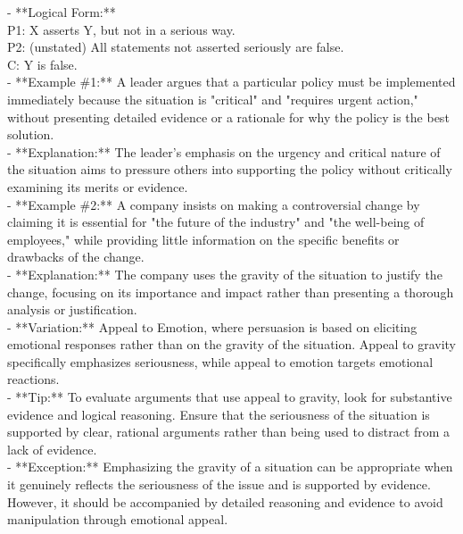 \documentclass[a4paper,12pt,single,pdftex]{scrbook}
\begin{document}
    
      - **Logical Form:**
    \\

    
      P1: X asserts Y, but not in a serious way.
    \\

    
      P2: (unstated) All statements not asserted seriously are false.
    \\

    
      C: Y is false.
    \\

    
      - **Example \#1:** A leader argues that a particular policy must be implemented immediately because the situation is "critical" and "requires urgent action," without presenting detailed evidence or a rationale for why the policy is the best solution.
    \\

    
      - **Explanation:** The leader's emphasis on the urgency and critical nature of the situation aims to pressure others into supporting the policy without critically examining its merits or evidence.
    \\

    
      - **Example \#2:** A company insists on making a controversial change by claiming it is essential for "the future of the industry" and "the well-being of employees," while providing little information on the specific benefits or drawbacks of the change.
    \\

    
      - **Explanation:** The company uses the gravity of the situation to justify the change, focusing on its importance and impact rather than presenting a thorough analysis or justification.
    \\

    
      - **Variation:** Appeal to Emotion, where persuasion is based on eliciting emotional responses rather than on the gravity of the situation. Appeal to gravity specifically emphasizes seriousness, while appeal to emotion targets emotional reactions.
    \\

    
      - **Tip:** To evaluate arguments that use appeal to gravity, look for substantive evidence and logical reasoning. Ensure that the seriousness of the situation is supported by clear, rational arguments rather than being used to distract from a lack of evidence.
    \\

    
      - **Exception:** Emphasizing the gravity of a situation can be appropriate when it genuinely reflects the seriousness of the issue and is supported by evidence. However, it should be accompanied by detailed reasoning and evidence to avoid manipulation through emotional appeal.
    \\
\end{document}
